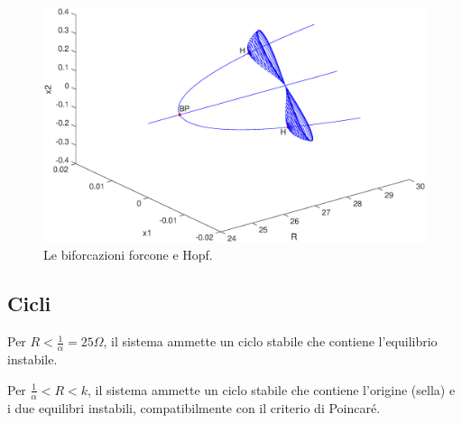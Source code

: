 \begin{enumerate}
\begin{figure}
    \centering
    \includegraphics[width=1.1\textwidth]{matcont/ForconeHopf}
    \caption{Le biforcazioni forcone e Hopf.}
    \label{fig:forcone}
\end{figure}

\subsection{Cicli}
Per $R<\frac{1}{\alpha}=25 \Omega$, il sistema ammette un ciclo stabile che contiene l'equilibrio instabile.

Per $\frac{1}{\alpha} < R < k$, il sistema ammette un ciclo stabile che contiene l'origine (sella) e i due equilibri instabili, compatibilmente con il criterio di Poincaré.


\end{enumerate}
